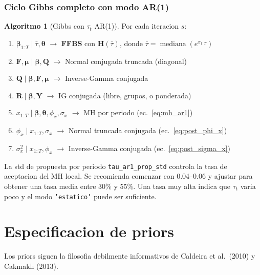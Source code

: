 \documentclass[12pt, a4paper]{article}
\theoremstyle{plain}
\theoremstyle{definition}
\newtheorem{algoritmo}{Algoritmo}[section]
\theoremstyle{remark}
\newcommand{\bbet}{\bm{\beta}}
\newcommand{\bmu}{\bm{\mu}}
\newcommand{\bY}{\mathbf{Y}}
\newcommand{\bH}{\mathbf{H}}
\newcommand{\bF}{\mathbf{F}}
\newcommand{\bQ}{\mathbf{Q}}
\newcommand{\bR}{\mathbf{R}}
\begin{document}
\subsubsection{Ciclo Gibbs completo con modo AR(1)}

\begin{algoritmo}[Gibbs con $\tau_t$ AR(1)]
\label{alg:gibbs_ar1}
Por cada iteracion $s$:
\begin{enumerate}[leftmargin=1.5em, itemsep=2pt]
  \item $\bbet_{1:T} \mid \bar{\tau}, \bm{\theta}$
    $\to$ \textbf{FFBS} con $\bH(\bar{\tau})$,
    donde $\bar{\tau} = \operatorname{mediana}(e^{x_{1:T}})$
  \item $\bF, \bmu \mid \bbet, \bQ$
    $\to$ Normal conjugada truncada (diagonal)
  \item $\bQ \mid \bbet, \bF, \bmu$
    $\to$ Inverse-Gamma conjugada
  \item $\bR \mid \bbet, \bY$
    $\to$ IG conjugada (libre, grupos, o ponderada)
  \item $x_{1:T} \mid \bbet, \bm{\theta}, \phi_x, \sigma_x$
    $\to$ MH por periodo (ec.~\ref{eq:mh_ar1})
  \item $\phi_x \mid x_{1:T}, \sigma_x$
    $\to$ Normal truncada conjugada (ec.~\ref{eq:post_phi_x})
  \item $\sigma_x^2 \mid x_{1:T}, \phi_x$
    $\to$ Inverse-Gamma conjugada (ec.~\ref{eq:post_sigma_x})
\end{enumerate}
\end{algoritmo}

\begin{tipbox}
La std de propuesta por periodo \texttt{tau\_ar1\_prop\_std} controla la
tasa de aceptacion del MH local. Se recomienda comenzar con 0.04--0.06
y ajustar para obtener una tasa media entre 30\% y 55\%.
Una tasa muy alta indica que $\tau_t$ varia poco y el modo \texttt{'estatico'}
puede ser suficiente.
\end{tipbox}

\section{Especificacion de priors}

Los priors siguen la filosofia debilmente informativos de
Caldeira et al.\ (2010) y Cakmaklı (2013).
\end{document}
